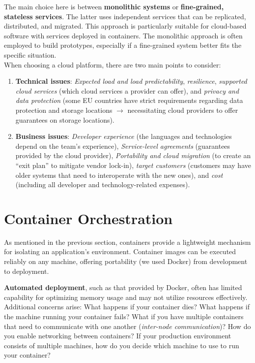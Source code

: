 The main choice here is between \textbf{monolithic systems} or \textbf{fine-grained, stateless services}. The latter uses independent services that can be replicated, distributed, and migrated. This approach is particularly suitable for cloud-based software with services deployed in containers. The monolithic approach is often employed to build prototypes, especially if a fine-grained system better fits the specific situation.\\

\noindent
When choosing a cloud platform, there are two main points to consider:

\begin{enumerate}
    \item \textbf{Technical issues}: \emph{Expected load and load predictability}, \emph{resilience}, \emph{supported cloud services} (which cloud services a provider can offer), and \emph{privacy and data protection} (some EU countries have strict requirements regarding data protection and storage locations $\rightarrow$ necessitating cloud providers to offer guarantees on storage locations).
    \item \textbf{Business issues}: \emph{Developer experience} (the languages and technologies depend on the team's experience), \emph{Service-level agreements} (guarantees provided by the cloud provider), \emph{Portability and cloud migration} (to create an ``exit plan'' to mitigate vendor lock-in), \emph{target customers} (customers may have older systems that need to interoperate with the new ones), and \emph{cost} (including all developer and technology-related expenses).
\end{enumerate}

\section{Container Orchestration}

As mentioned in the previous section, containers provide a lightweight mechanism for isolating an application's environment. Container images can be executed reliably on any machine, offering portability (we used Docker) from development to deployment. 

\newpage
\noindent
\textbf{Automated deployment}, such as that provided by Docker, often has limited capability for optimizing memory usage and may not utilize resources effectively. Additional concerns arise: What happens if your container dies? What happens if the machine running your container fails? What if you have multiple containers that need to communicate with one another (\emph{inter-node communication})? How do you enable networking between containers? If your production environment consists of multiple machines, how do you decide which machine to use to run your container?

